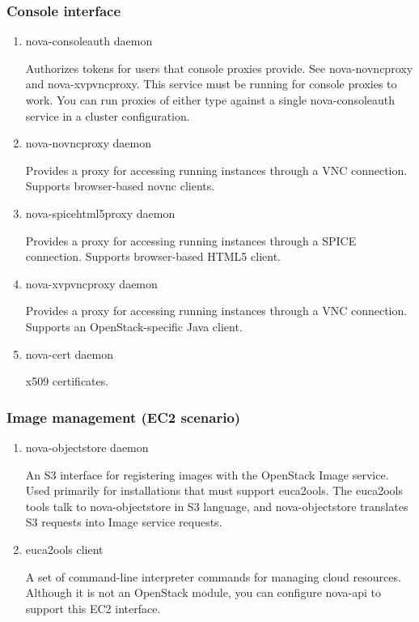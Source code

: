     \subsubsection{Console interface}
        \begin{enumerate}
            \item nova-consoleauth daemon
            \par Authorizes tokens for users that console proxies provide. See nova-novncproxy and nova-xvpvncproxy. This service must be running for console proxies to work. You can run proxies of either type against a single nova-consoleauth service in a cluster configuration.
            
            \item nova-novncproxy daemon
            \par Provides a proxy for accessing running instances through a VNC connection. Supports browser-based novnc clients.

            \item nova-spicehtml5proxy daemon
            \par Provides a proxy for accessing running instances through a SPICE connection. Supports browser-based HTML5 client.

            \item nova-xvpvncproxy daemon
            \par Provides a proxy for accessing running instances through a VNC connection. Supports an OpenStack-specific Java client.

            \item nova-cert daemon
            \par x509 certificates.
        \end{enumerate}
    \subsubsection{Image management (EC2 scenario)}
        \begin{enumerate}
            \item nova-objectstore daemon
            \par An S3 interface for registering images with the OpenStack Image service. Used primarily for installations that must support euca2ools. The euca2ools tools talk to nova-objectstore in S3 language, and nova-objectstore translates S3 requests into Image service requests.

            \item euca2ools client
            \par A set of command-line interpreter commands for managing cloud resources. Although it is not an OpenStack module, you can configure nova-api to support this EC2 interface.
        \end{enumerate}
